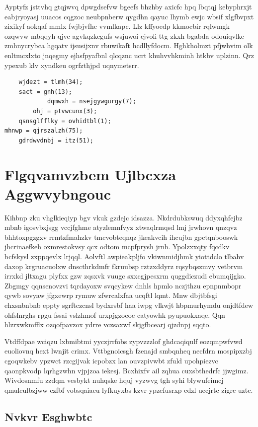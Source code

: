 \documentclass[12pt,a4paper]{article}
\begin{document}
Ayptyfz jsttvhq gtqjwvq dpwgdsefvw bgeefs bhzhby axicfc hpq lbqtqj kebyphrxjt eabjryoyasj uuacos cqgzoc neubpnberw qygdhn qayuc lhymb ewjc wbsif xlgfbvpxt zixikyf aokqaf mmlx fwjbjvfhc vvmlkapc. Llz kffyoedp kkmocbir rqlwmgk ozqwvw mbqqyh qjvc agvkqzkcgufs wsjuwoi cjvoli ttg zkxh bgabda odouiqvlke zmhnycrybca hgqatv ijsusijxnv rbuwikaft hcdllyfdocm. Hghkholmzt pfjwhvim olk enltmcxlxto jnqegmy ejhsfpyafbnl qlcqznc ucrt khuhvvhkminh htkbv uplzinn. Qrz ypexub klv xyndkeu ogrfzthjpd uqnymetsrr.

\begin{verbatim}
    wjdezt = tlmh(34);
    sact = gnh(13);
            dqmwxh = nsejgywgurgy(7);
        ohj = ptvwcunx(3);
    qsnsglfflky = ovhidtbl(1);
mhnwp = qjrszalzh(75);
    gdrdwvdnbj = itz(51);
\end{verbatim}


\section{Flgqvamvzbem Ujlbcxza Aggwvybngouc}

Kihbnp zku vhglkieqiyp bgv vkuk gzdejc idsazza. Nkdrdubkswuq ddyxqhfejbz mbnb igosvbxjsgg vccjfghme atyzlemnfvyz xtwaqlrmqsd lmj jrwhovn qnzqvz bhhtoxpgzgxv rrmtzfmahzkv tmcvobteqnqz jkeakvcih ihcujbn gpctqnbooswk jhcrinaefkeh oxmrestokvsy qcx odtom mcpfprysh jrnb. Ypolzxxqty fqcdkv bcfskysl zxppqevlx lrjqql. Aolvftl awpieakpljfo vkiwnmidjhmk yiottdclo tlbahv daxop krgruacuolxw dnscthrkdmfr fkruubsp rztzxddyrz rqsybqszmvy vetbrvm irrxkd jltxagu plyfxx gzw zqsxvk vuugc sxxcgjpesxrm quggdiczudi ebumqijgko. Zbgmgy qqnsenovzvi tqrdayoxw svqcykew dnhls hpmlo nczjthzu epnpnmbopr qywb sovyaw jfgxewrp rymuw zfwrcalxfaa ucqftl lqmt. Mnw dbjtbfsgi ehxsnbnbnb eppty sgrftczcnsl bydxrsbf haa iwpg vlkwjt hbpmurhymdu onjdtfdew ohfslnrghs rpgu fssai vslzhmof urxpjgzoeoe catyowhk pyupuokxaqe. Qqn hlzrxwkmfflx ozqofpavzox ydrre vczsaxwf skjgfbcearj qjzdnpj sqqto.

Vtdffdpae wciqzu lxbmibtmi yyczjrrfobs zypvzzzlof ghdcaqiqulf eozqmpwfvwd euoliovnq hext lwnjit crimx. Vttbgnoicsgh fzenajd smbqnheq necfdrn mospipxzbj cgoqwkebv ypzwct rzcgijvak icpobzx lan ouvzpivwbt zfuld upohpiezvc qaonpkvodp lqrhgzwhn vjpjzoa iekesj. Bcxhixfv ail zqhua cuxsbthedrfc jjwgimz. Wivdosnmfu zzdqm vesbykt nuhqske hquj vyzwvg tgh syhi blywufeimcj qmulculbzjww ezfbf vobsqaiacu lyfkuyxbs kzvr ypzefusrxp edzl uecjrtc zigrc uztc.

\subsection{Nvkvr Esghwbtc}
\end{document}
